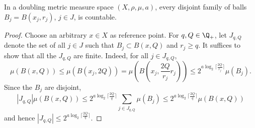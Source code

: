 \begin{lemma}
    \label{disjoint-family-countable}
    In a doubling metric measure space $(X,\rho,\mu, a)$, every disjoint family of balls $B_j = B(x_j, r_j)$, $j\in J$, is countable.
\end{lemma}
\begin{proof}
    Choose an arbitrary $x\in X$ as reference point. For $q, Q\in\Q_+$, let $J_{q,Q}$ denote the set of all $j\in J$ such that $B_j\subset B(x, Q)$ and $r_j \ge q$. It suffices to show that all the $J_{q,Q}$ are finite.
    Indeed, for all $j\in J_{q,Q}$,
    \begin{equation*}
        \mu(B(x, Q)) \le \mu(B(x_j, 2Q)) = \mu(B(x_j, \frac{2 Q}{r_j} r_j))
        \le 2^{a\log_2{\lceil \frac{2 Q}{r_j}\rceil}} \mu(B_j).
    \end{equation*}
    Since the $B_j$ are disjoint,
    \begin{equation}
        |J_{q,Q}| \mu(B(x, Q)) \le 2^{a\log_2{\lceil\frac{2Q}{q}\rceil}} \sum_{j\in J_{q,Q}} \mu(B_j) \le 2^{a\log_2{\lceil\frac{2Q}{q}\rceil}} \mu(B(x,Q))
    \end{equation}
    and hence $|J_{q,Q}| \le 2^{a\log_2{\lceil\frac{2Q}{q}\rceil}}$.
\end{proof}


